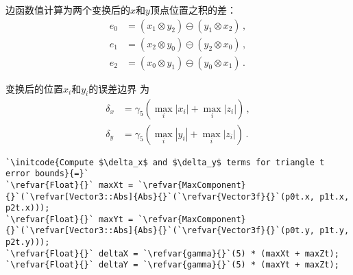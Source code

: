 边函数值计算为两个变换后的$x$和$y$顶点位置之积的差：
\begin{align*}
    e_0 & =(x_1\otimes y_2)\ominus(y_1\otimes x_2)\, , \\
    e_1 & =(x_2\otimes y_0)\ominus(y_2\otimes x_0)\, , \\
    e_2 & =(x_0\otimes y_1)\ominus(y_0\otimes x_1)\, .
\end{align*}

变换后的位置$x_i$和$y_i$的误差边界
为
\begin{align*}
    \delta_x & =\gamma_5(\max_i{|x_i|}+\max_i{|z_i|})\, , \\
    \delta_y & =\gamma_5(\max_i{|y_i|}+\max_i{|z_i|})\, .
\end{align*}

\begin{lstlisting}
`\initcode{Compute $\delta_x$ and $\delta_y$ terms for triangle t error bounds}{=}`
`\refvar{Float}{}` maxXt = `\refvar{MaxComponent}{}`(`\refvar[Vector3::Abs]{Abs}{}`(`\refvar{Vector3f}{}`(p0t.x, p1t.x, p2t.x)));
`\refvar{Float}{}` maxYt = `\refvar{MaxComponent}{}`(`\refvar[Vector3::Abs]{Abs}{}`(`\refvar{Vector3f}{}`(p0t.y, p1t.y, p2t.y)));
`\refvar{Float}{}` deltaX = `\refvar{gamma}{}`(5) * (maxXt + maxZt);
`\refvar{Float}{}` deltaY = `\refvar{gamma}{}`(5) * (maxYt + maxZt);
\end{lstlisting}


